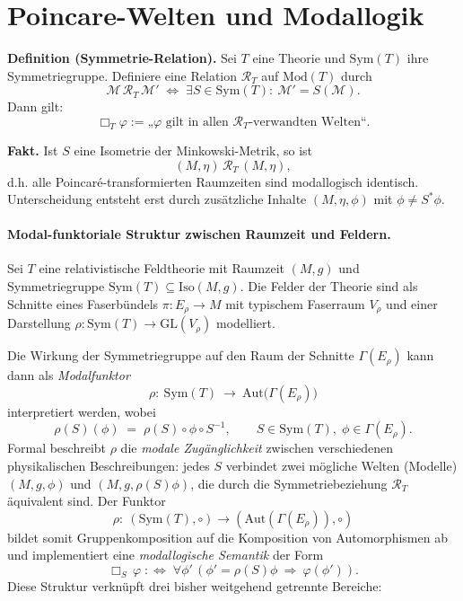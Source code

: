\documentclass[10pt, letterpaper]{article}
\begin{document}
\pagebreak

\section{Poincare-Welten und Modallogik}

\textbf{Definition (Symmetrie-Relation).}
Sei $T$ eine Theorie und $\mathrm{Sym}(T)$ ihre Symmetriegruppe.
Definiere eine Relation $\mathcal{R}_T$ auf $\mathrm{Mod}(T)$ durch
\[
\mathcal{M}\,\mathcal{R}_T\,\mathcal{M}' \;\Longleftrightarrow\;
\exists S\in\mathrm{Sym}(T):\ \mathcal{M}' = S(\mathcal{M}).
\]
Dann gilt:
\[
\Box_T\varphi := \text{„$\varphi$ gilt in allen $\mathcal{R}_T$-verwandten Welten“}.
\]

\textbf{Fakt.}
Ist $S$ eine Isometrie der Minkowski-Metrik, so ist
\[
(M,\eta)\,\mathcal{R}_T\,(M,\eta),
\]
d.h. alle Poincaré-transformierten Raumzeiten sind modallogisch identisch.
Unterscheidung entsteht erst durch zusätzliche Inhalte $(M,\eta,\phi)$ mit $\phi\neq S^*\phi$.

\paragraph{Modal-funktoriale Struktur zwischen Raumzeit und Feldern.}

Sei $T$ eine relativistische Feldtheorie mit Raumzeit $(M,g)$ und Symmetriegruppe
$\mathrm{Sym}(T)\subseteq \mathrm{Iso}(M,g)$.
Die Felder der Theorie sind als Schnitte eines Faserbündels
$\pi:E_\rho\to M$ mit typischem Faserraum $V_\rho$
und einer Darstellung $\rho:\mathrm{Sym}(T)\to\mathrm{GL}(V_\rho)$ modelliert.

Die Wirkung der Symmetriegruppe auf den Raum der Schnitte
$\Gamma(E_\rho)$ kann dann als \emph{Modalfunktor}
\[
\rho:\ \mathrm{Sym}(T)\ \longrightarrow\ \mathrm{Aut}\!\big(\Gamma(E_\rho)\big)
\]
interpretiert werden, wobei
\[
\rho(S)(\phi)\;=\;\rho(S)\circ \phi\circ S^{-1},
\qquad S\in\mathrm{Sym}(T),\;\phi\in\Gamma(E_\rho).
\]
Formal beschreibt $\rho$ die \emph{modale Zugänglichkeit} zwischen
verschiedenen physikalischen Beschreibungen:
jedes $S$ verbindet zwei mögliche Welten (Modelle) $(M,g,\phi)$ und $(M,g,\rho(S)\phi)$,
die durch die Symmetriebeziehung $\mathcal{R}_T$ äquivalent sind.
Der Funktor
\[
\rho:\ (\mathrm{Sym}(T),\circ)\longrightarrow(\mathrm{Aut}(\Gamma(E_\rho)),\circ)
\]
bildet somit Gruppenkomposition auf die Komposition von
Automorphismen ab und implementiert eine \emph{modallogische Semantik} der Form
\[
\Box_S\,\varphi \;:\Longleftrightarrow\;
\forall \phi'\,(\phi'\!=\!\rho(S)\phi\ \Rightarrow\ \varphi(\phi')).
\]
Diese Struktur verknüpft drei bisher weitgehend getrennte Bereiche:
\end{document}
